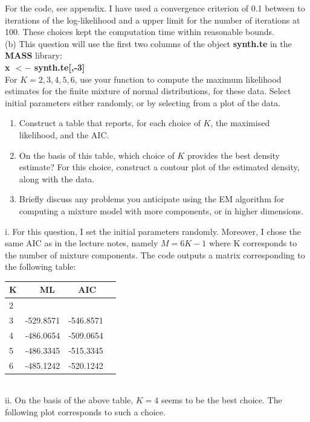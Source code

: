 \documentclass{article}
\begin{document}
For the code, see appendix. I have used a convergence criterion of 0.1 between to iterations of the log-likelihood and a upper limit for the number of iterations at 100. These choices kept the computation time within reasonable bounds.\\

(b) This question will use the first two columns of the object \textbf{synth.te} in the \textbf{MASS} library: \\

\textbf{x $<-$ synth.te[,-3]}\\

For $K = 2, 3, 4, 5, 6$, use your function to compute the maximum likelihood estimates for the finite mixture of normal distributions, for these data. Select initial parameters either randomly, or by selecting from a plot of the data.

\begin{enumerate}[label=\roman*.]
\item Construct a table that reports, for each choice of $K$, the maximised likelihood, and the AIC.
\item On the basis of this table, which choice of $K$ provides the best density estimate? For this choice, construct a contour plot of the estimated density, along with the data.
\item Briefly discuss any problems you anticipate using the EM algorithm for computing a mixture model with more components, or in higher dimensions.
\end{enumerate}

i. For this question, I set the initial parameters randomly. Moreover, I chose the same AIC as in the lecture notes, namely $M=6K-1$ where K corresponds to the number of mixture components. The code outputs a matrix corresponding to the following table:\\


\begin{center}
    \begin{tabular}{ | l | l | l | p{1.5cm} |}
    \hline
    K & \ \ \ ML & \ \ AIC  \\ \hline
    2 &  &  \\ \hline
    3 &  -529.8571 & -546.8571  \\ \hline
    4 &  -486.0654 & {\color{red}-509.0654} \\ \hline
    5 &  -486.3345 &-515.3345  \\ \hline
    6 &  -485.1242 & -520.1242  \\ \hline

   
    \end{tabular}
\end{center}
\\
ii. On the basis of the above table, $K=4$ seems to be the best choice. The following plot corresponds to such a choice.
\end{document}
